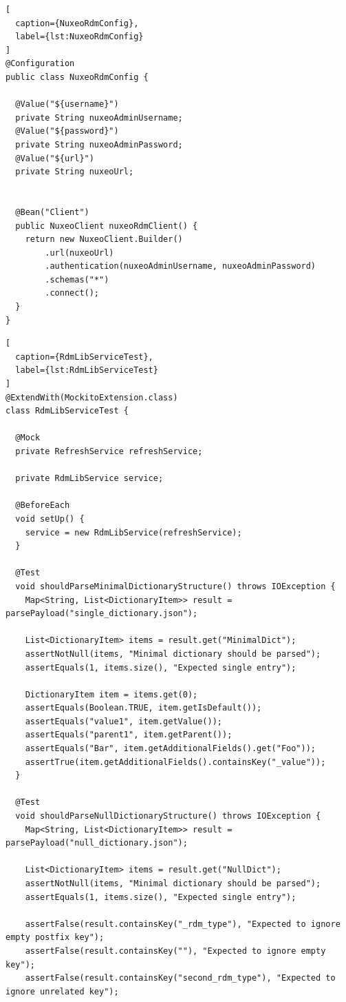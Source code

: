 \begin{lstlisting}[
  caption={NuxeoRdmConfig},
  label={lst:NuxeoRdmConfig}
]
@Configuration
public class NuxeoRdmConfig {

  @Value("${username}")
  private String nuxeoAdminUsername;
  @Value("${password}")
  private String nuxeoAdminPassword;
  @Value("${url}")
  private String nuxeoUrl;
  

  @Bean("Client")
  public NuxeoClient nuxeoRdmClient() {
    return new NuxeoClient.Builder()
        .url(nuxeoUrl)
        .authentication(nuxeoAdminUsername, nuxeoAdminPassword)
        .schemas("*")
        .connect();
  }
}
\end{lstlisting}

\begin{lstlisting}[
  caption={RdmLibServiceTest},
  label={lst:RdmLibServiceTest}
]
@ExtendWith(MockitoExtension.class)
class RdmLibServiceTest {

  @Mock
  private RefreshService refreshService;

  private RdmLibService service;

  @BeforeEach
  void setUp() {
    service = new RdmLibService(refreshService);
  }

  @Test
  void shouldParseMinimalDictionaryStructure() throws IOException {
    Map<String, List<DictionaryItem>> result = parsePayload("single_dictionary.json");

    List<DictionaryItem> items = result.get("MinimalDict");
    assertNotNull(items, "Minimal dictionary should be parsed");
    assertEquals(1, items.size(), "Expected single entry");

    DictionaryItem item = items.get(0);
    assertEquals(Boolean.TRUE, item.getIsDefault());
    assertEquals("value1", item.getValue());
    assertEquals("parent1", item.getParent());
    assertEquals("Bar", item.getAdditionalFields().get("Foo"));
    assertTrue(item.getAdditionalFields().containsKey("_value"));
  }

  @Test
  void shouldParseNullDictionaryStructure() throws IOException {
    Map<String, List<DictionaryItem>> result = parsePayload("null_dictionary.json");

    List<DictionaryItem> items = result.get("NullDict");
    assertNotNull(items, "Minimal dictionary should be parsed");
    assertEquals(1, items.size(), "Expected single entry");

    assertFalse(result.containsKey("_rdm_type"), "Expected to ignore empty postfix key");
    assertFalse(result.containsKey(""), "Expected to ignore empty key");
    assertFalse(result.containsKey("second_rdm_type"), "Expected to ignore unrelated key");


\end{lstlisting}
